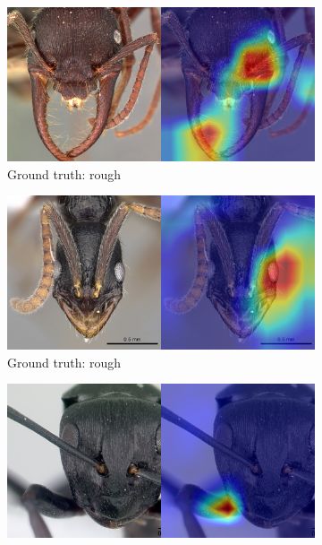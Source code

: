 \documentclass[12pt]{article}
\begin{document}
\begin{figure}
    \centering
    \begin{subfigure}{\subwidth}
        \includegraphics[width=1\linewidth]{assets/gradcam/incorrect_nonideal/1.png}
        \caption{Ground truth: rough}
        \label{fig:incorrect_nonideal_1}
    \end{subfigure}
    \begin{subfigure}{\subwidth}
        \includegraphics[width=1\linewidth]{assets/gradcam/incorrect_nonideal/22.png}
        \caption{Ground truth: rough}
        \label{fig:incorrect_nonideal_22}
    \end{subfigure}
    \begin{subfigure}{\subwidth}
        \includegraphics[width=1\linewidth]{assets/gradcam/incorrect_nonideal/61.png}

\end{subfigure}
\end{figure}
\end{document}
